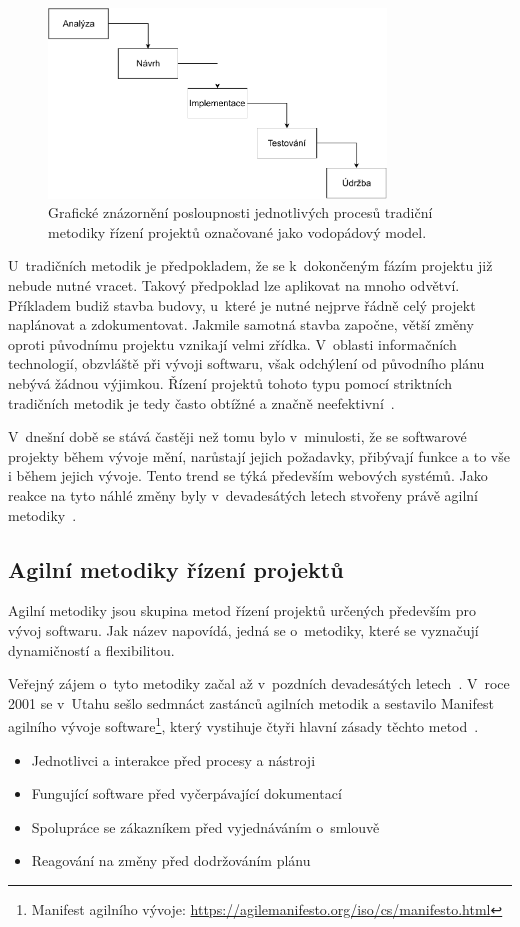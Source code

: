 \begin{figure}[H]
	\centering
	\includegraphics[width=0.8\textwidth]{obrazky-figures/waterfall-wide.pdf}
	\caption{Grafické znázornění posloupnosti jednotlivých procesů tradiční metodiky řízení projektů označované jako vodopádový model.}
	\label{img:waterfall}
\end{figure}

U~tradičních metodik je předpokladem, že se k~dokončeným fázím projektu již nebude nutné vracet. Takový předpoklad lze aplikovat na mnoho odvětví. Příkladem budiž stavba budovy, u~které je nutné nejprve řádně celý projekt naplánovat a zdokumentovat. Jakmile samotná stavba započne, větší změny oproti původnímu projektu vznikají velmi zřídka. V~oblasti informačních technologií, obzvláště při vývoji softwaru, však odchýlení od původního plánu nebývá žádnou výjimkou. Řízení projektů tohoto typu pomocí striktních tradičních metodik je tedy často obtížné a značně neefektivní~\cite{bib:agile-vs-traditional-what}.

V~dnešní době se stává častěji než tomu bylo v~minulosti, že se softwarové projekty během vývoje mění, narůstají jejich požadavky, přibývají funkce a to vše i během jejich vývoje. Tento trend se týká především webových systémů. Jako reakce na tyto náhlé změny byly v~devadesátých letech stvořeny právě agilní metodiky~\cite{bib:agile-history}. 

\subsection{Agilní metodiky řízení projektů}
Agilní metodiky jsou skupina metod řízení projektů určených především pro vývoj softwaru. Jak název napovídá, jedná se o~metodiky, které se vyznačují dynamičností a flexibilitou.

Veřejný zájem o~tyto metodiky začal až v~pozdních devadesátých letech~\cite{bib:agile-mobile}. V~roce 2001 se v~Utahu sešlo sedmnáct zastánců agilních metodik a sestavilo Manifest agilního vývoje software\footnote{ Manifest agilního vývoje: \url{https://agilemanifesto.org/iso/cs/manifesto.html}}, který vystihuje čtyři hlavní zásady těchto metod~\cite{bib:agile-manifest}.
\begin{itemize}
  \item Jednotlivci a interakce před procesy a nástroji
  \item Fungující software před vyčerpávající dokumentací
  \item Spolupráce se zákazníkem před vyjednáváním o~smlouvě
  \item Reagování na změny před dodržováním plánu
\end{itemize}

